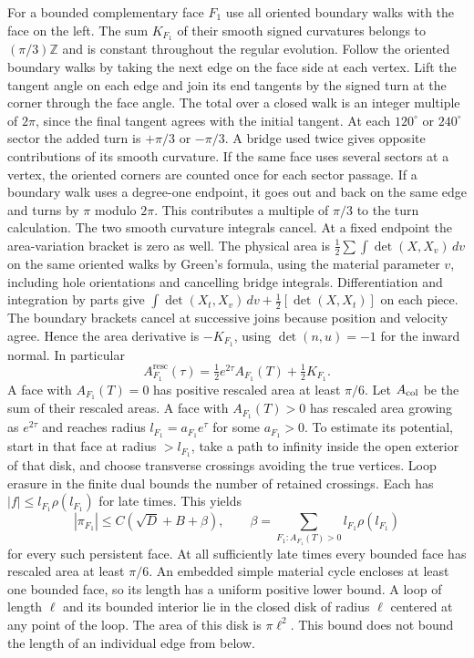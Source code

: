For a bounded complementary face \(F_1\) use all oriented boundary walks with the face on the left. The sum \(K_{F_1}\) of their smooth signed curvatures belongs to \((\pi/3)\mathbb Z\) and is constant throughout the regular evolution. Follow the oriented boundary walks by taking the next edge on the face side at each vertex. Lift the tangent angle on each edge and join its end tangents by the signed turn at the corner through the face angle. The total over a closed walk is an integer multiple of \(2\pi\), since the final tangent agrees with the initial tangent. At each \(120^\circ\) or \(240^\circ\) sector the added turn is \(+\pi/3\) or \(-\pi/3\). A bridge used twice gives opposite contributions of its smooth curvature. If the same face uses several sectors at a vertex, the oriented corners are counted once for each sector passage. If a boundary walk uses a degree-one endpoint, it goes out and back on the same edge and turns by \(\pi\) modulo \(2\pi\). This contributes a multiple of \(\pi/3\) to the turn calculation. The two smooth curvature integrals cancel. At a fixed endpoint the area-variation bracket is zero as well. The physical area is \(\frac12\sum\int\det(X,X_v)\,dv\) on the same oriented walks by Green's formula, using the material parameter \(v\), including hole orientations and cancelling bridge integrals. Differentiation and integration by parts give \(\int\det(X_t,X_v)\,dv+\frac12[\det(X,X_t)]\) on each piece. The boundary brackets cancel at successive joins because position and velocity agree. Hence the area derivative is \(-K_{F_1}\), using \(\det(n,u)=-1\) for the inward normal. In particular \begin{equation}\label{eq:face-area}
 A_{F_1}^\mathrm{resc}(\tau)
 =\tfrac12 e^{2\tau}A_{F_1}(T)+\tfrac12 K_{F_1}.
\end{equation} A face with \(A_{F_1}(T)=0\) has positive rescaled area at least \(\pi/6\). Let \(A_{\rm col}\) be the sum of their rescaled areas. A face with \(A_{F_1}(T)>0\) has rescaled area growing as \(e^{2\tau}\) and reaches radius \(l_{F_1}=a_{F_1}e^\tau\) for some \(a_{F_1}>0\). To estimate its potential, start in that face at radius \(>l_{F_1}\), take a path to infinity inside the open exterior of that disk, and choose transverse crossings avoiding the true vertices. Loop erasure in the finite dual bounds the number of retained crossings. Each has \(|f|\le l_{F_1}\rho(l_{F_1})\) for late times. This yields \[
 |\pi_{F_1}|\le C(\sqrt D+B+\beta),\qquad
 \beta=\sum_{F_1:A_{F_1}(T)>0} l_{F_1}\rho(l_{F_1})
\] for every such persistent face. At all sufficiently late times every bounded face has rescaled area at least \(\pi/6\). An embedded simple material cycle encloses at least one bounded face, so its length has a uniform positive lower bound. A loop of length \(\ell\) and its bounded interior lie in the closed disk of radius \(\ell\) centered at any point of the loop. The area of this disk is \(\pi\ell^2\). This bound does not bound the length of an individual edge from below.

